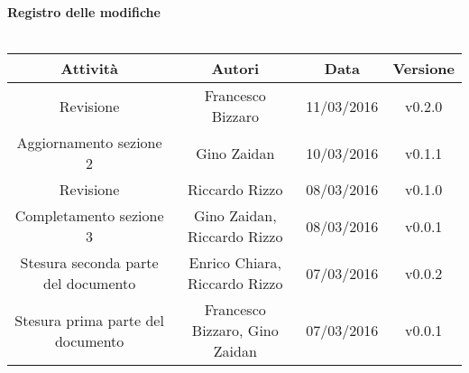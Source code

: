 \vspace{1cm}
   {\fontsize{15pt}{16pt}\selectfont \textbf{Registro delle modifiche}}\\ \\

\bgroup
\def\arraystretch{1.6}
\begin{tabular}{| c | c | c | c |}
\hline
\textbf{Attività} & \textbf{Autori} & \textbf{Data} & \textbf{Versione}\\ \hline \hline


Revisione & Francesco Bizzaro & 11/03/2016 & v0.2.0 \\ \hline  

Aggiornamento sezione 2 & Gino Zaidan & 10/03/2016 & v0.1.1 \\ \hline  

Revisione & Riccardo Rizzo & 08/03/2016 & v0.1.0 \\ \hline  

Completamento sezione 3 & Gino Zaidan, Riccardo Rizzo & 08/03/2016 & v0.0.1 \\ \hline

Stesura seconda parte del documento & Enrico Chiara, Riccardo Rizzo & 07/03/2016 & v0.0.2 \\ \hline

Stesura prima parte del documento & Francesco Bizzaro, Gino Zaidan & 07/03/2016 & v0.0.1 \\ \hline 


\end{tabular}
\egroup
\newpage